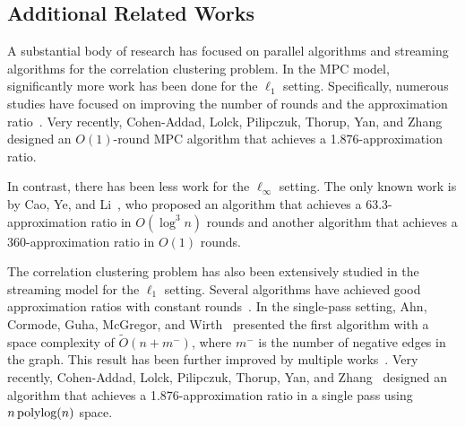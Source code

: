 \subsection{Additional Related Works}

A substantial body of research has focused on parallel algorithms and streaming algorithms for the correlation clustering problem. In the MPC model, significantly more work has been done for the $\ell_1$ setting. Specifically, numerous studies have focused on improving the number of rounds and the approximation ratio~\cite{blelloch2012greedy, PPORRJ15, FischerN20, CCMU21, DBLP:conf/icml/Cohen-AddadLMNP21, assadi2021sublinear, CKLPU23, cao2024breaking}. Very recently, Cohen-Addad, Lolck, Pilipczuk, Thorup, Yan, and Zhang~\cite{cohen2024combinatorial} designed an $O(1)$-round MPC algorithm that achieves a 1.876-approximation ratio.


In contrast, there has been less work for the $\ell_{\infty}$ setting. The only known work is by Cao, Ye, and Li~\cite{cao2024simultaneously}, who proposed an algorithm that achieves a 63.3-approximation ratio in $O(\log^3 n)$ rounds and another algorithm that achieves a 360-approximation ratio in $O(1)$ rounds.

The correlation clustering problem has also been extensively studied in the streaming model for the $\ell_1$ setting. Several algorithms have achieved good approximation ratios with constant rounds~\cite{CDK14, ACGMW21, DBLP:conf/icml/Cohen-AddadLMNP21, BCMT22}. In the single-pass setting, Ahn, Cormode, Guha, McGregor, and Wirth~\cite{ACGMW21} presented the first algorithm with a space complexity of $\tilde{O}(n + m^-)$, where $m^-$ is the number of negative edges in the graph. This result has been further improved by multiple works~\cite{assadi2021sublinear, BCMT22, chakrabarty2023single}. Very recently, Cohen-Addad, Lolck, Pilipczuk, Thorup, Yan, and Zhang~\cite{cohen2024combinatorial} designed an algorithm that achieves a 1.876-approximation ratio in a single pass using $n \operatorname{\text{{\rm polylog}}}(n)$ space.

